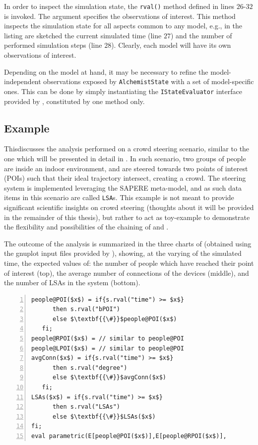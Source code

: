 \documentclass[12pt,a4paper,twoside,openright]{book}
\begin{document}
In order to inspect the simulation state, the \texttt{rval()} method defined in lines $26$-$32$ is invoked.
%
The argument specifies the observations of interest.
%
This method inspects the simulation state for all aspects common to any \alchemist{} model, e.g., in the listing are sketched the current simulated time (line $27$) and the number of performed simulation steps (line $28$).
%
Clearly, each \alchemist{} model will have its own observations of interest.

Depending on the model at hand, it may be necessary to refine the model-independent observations exposed by \texttt{AlchemistState} with a set of model-specific ones. This can be done by simply instantiating the \texttt{IStateEvaluator} interface provided by \multivesta, constituted by one method only.

\subsection{Example}

This\levelText{}discusses the analysis performed on a crowd steering scenario, similar to the one which will be presented in detail in .
%
In such scenario, two groups of people are inside an indoor environment, and are steered towards two points of interest (POIs) such that their ideal trajectory intersect, creating a crowd.
%
The steering system is implemented leveraging the SAPERE meta-model, and as such data items in this scenario are called \texttt{LSA}s.
%
This example is not meant to provide significant scientific insights on crowd steering (thoughts about it will be provided in the remainder of this thesis), but rather to act as toy-example to demonstrate the flexibility and possibilities of the chaining of \alchemist{} and \multivesta{}.

The outcome of the analysis is summarized in the three charts of  (obtained using the gnuplot input files provided by \multivesta{}), showing, at the varying of the simulated time, the expected values of: the number of people which have reached their point of interest (top), the average number of connections of the devices (middle), and the number of LSAs in the system (bottom).

\lstset{caption=The evaluated parametric multi-expression ($MainMQ$), label=listing:parametricMQ}
\begin{lstlisting}[frame=single, mathescape, morekeywords={parametric,eval,E,if,fi,then,else,s,rval,evalME,evalOnceME}, float=t, numbers=left]
people@POI($x$) = if{s.rval("time") >= $x$}
      then s.rval("bPOI")
      else $\textbf{{\#}}$people@POI($x$)
   fi;
people@RPOI($x$) = // similar to people@POI
people@LPOI($x$) = // similar to people@POI
avgConn($x$) = if{s.rval("time") >= $x$}
      then s.rval("degree")
      else $\textbf{{\#}}$avgConn($x$)
   fi;
LSAs($x$) = if{s.rval("time") >= $x$}
      then s.rval("LSAs") 
      else $\textbf{{\#}}$LSAs($x$)
fi;
eval parametric(E[people@POI($x$)],E[people@RPOI($x$)],              E[people@LPOI($x$)],E[avgConn($x$)],E[LSAs($x$)],$x$,$0.0$,$1.0$,$50.0$);
\end{lstlisting}
\end{document}
